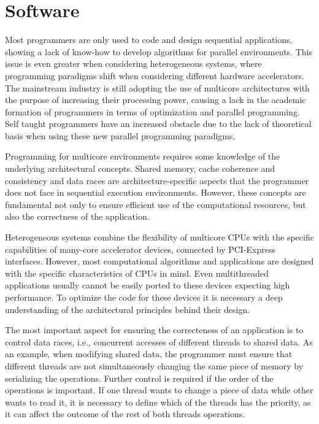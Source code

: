 \section{Software}
\label{Software}

Most programmers are only used to code and design sequential applications, showing a lack of know-how to develop algorithms for parallel environments. This issue is even greater when considering heterogeneous systems, where programming paradigms shift when considering different hardware accelerators. The mainstream industry is still adopting the use of multicore architectures with the purpose of increasing their processing power, causing a lack in the academic formation of programmers in terms of optimization and parallel programming. Self taught programmers have an increased obstacle due to the lack of theoretical basis when using these new parallel programming paradigms.

Programming for multicore environments requires some knowledge of the underlying architectural concepts. Shared memory, cache coherence and consistency and data races are architecture-specific aspects that the programmer does not face in sequential execution environments. However, these concepts are fundamental not only to ensure efficient use of the computational resources, but also the correctness of the application.

Heterogeneous systems combine the flexibility of multicore CPUs with the specific capabilities of many-core accelerator devices, connected by PCI-Express interfaces. However, most computational algorithms and applications are designed with the specific characteristics of CPUs in mind. Even multithreaded applications usually cannot be easily ported to these devices expecting high performance. To optimize the code for these devices it is necessary a deep understanding of the architectural principles behind their design.

The most important aspect for ensuring the correcteness of an application is to control data races, i.e., concurrent accesses of different threads to shared data. As an example, when modifying shared data, the programmer must ensure that different threads are not simultaneously changing the same piece of memory by serializing the operations. Further control is required if the order of the operations is important. If one thread wants to change a piece of data while other wants to read it, it is necessary to define which of the threads has the priority, as it can affect the outcome of the rest of both threads operations.

